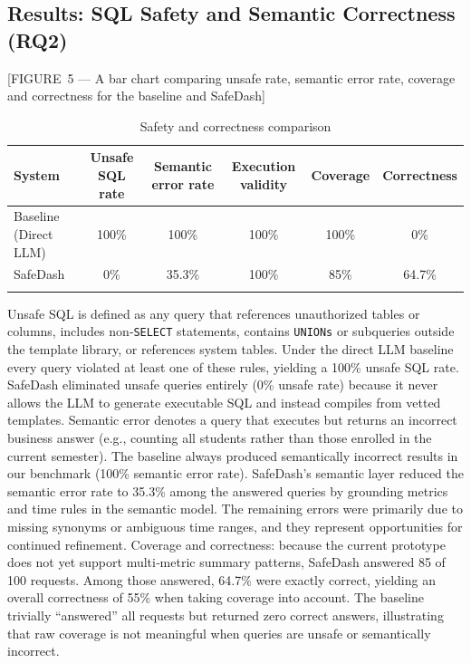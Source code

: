\documentclass[11pt]{article}
\begin{document}
\subsection{Results: SQL Safety and Semantic Correctness (RQ2)}
[FIGURE 5 — A bar chart comparing unsafe rate, semantic error rate, coverage and correctness for the baseline and SafeDash]

\begin{longtable}{lccccc}
\toprule
\textbf{System} & \textbf{Unsafe SQL rate} & \textbf{Semantic error rate} & \textbf{Execution validity} & \textbf{Coverage} & \textbf{Correctness}\\
\midrule
Baseline (Direct LLM) & 100\% & 100\% & 100\% & 100\% & 0\%\\
SafeDash & 0\% & 35.3\% & 100\% & 85\% & 64.7\%\\
\bottomrule
\caption{Safety and correctness comparison}\label{tab:safety}
\end{longtable}

Unsafe SQL is defined as any query that references unauthorized tables or columns, includes non‑\texttt{SELECT} statements, contains \texttt{UNIONs} or subqueries outside the template library, or references system tables. Under the direct LLM baseline every query violated at least one of these rules, yielding a 100\% unsafe SQL rate. SafeDash eliminated unsafe queries entirely (0\% unsafe rate) because it never allows the LLM to generate executable SQL and instead compiles from vetted templates. Semantic error denotes a query that executes but returns an incorrect business answer (e.g., counting all students rather than those enrolled in the current semester). The baseline always produced semantically incorrect results in our benchmark (100\% semantic error rate). SafeDash’s semantic layer reduced the semantic error rate to 35.3\% among the answered queries by grounding metrics and time rules in the semantic model. The remaining errors were primarily due to missing synonyms or ambiguous time ranges, and they represent opportunities for continued refinement. Coverage and correctness: because the current prototype does not yet support multi‑metric summary patterns, SafeDash answered 85 of 100 requests. Among those answered, 64.7\% were exactly correct, yielding an overall correctness of 55\% when taking coverage into account. The baseline trivially “answered” all requests but returned zero correct answers, illustrating that raw coverage is not meaningful when queries are unsafe or semantically incorrect.
\end{document}
